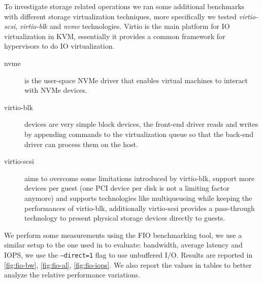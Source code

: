 \documentclass[twocolumn]{article}
\begin{document}
To investigate storage related operations we ran some additional benchmarks with different storage virtualization techniques, more specifically we tested \textit{virtio-scsi}, \textit{virtio-blk} and \textit{nvme} technologies. Virtio is the main platform for IO virtualization in KVM, essentially it provides a common framework for hypervisors to do IO virtualization.

\begin{description}
    \item[nvme] is the user-space NVMe driver that enables virtual machines to interact with NVMe devices.
    \item[virtio-blk] devices are very simple block devices, the front-end driver reads and writes by appending commands to the virtualization queue so that the back-end driver can process them on the host.
    \item[virtio-scsi] aims to overcome some limitations introduced by virtio-blk, support more devices per guest (one PCI device per disk is not a limiting factor anymore) and supports technologies like multiqueueing while keeping the performances of virtio-blk, additionally virtio-scsi provides a pass-through technology to present physical storage devices directly to guests.\cite{scsi}
\end{description}

We perform some measurements using the FIO \cite{fio} benchmarking tool, we use a similar setup to the one used in \cite{spool} to evaluate: bandwidth, average latency and IOPS, we use the \texttt{--direct=1} flag to use unbuffered I/O. Results are reported in \ref{fig:fio-bw}, \ref{fig:fio-al}, \ref{fig:fio-iops}. We also report the values in tables to better analyze the relative performance variations.
\end{document}
